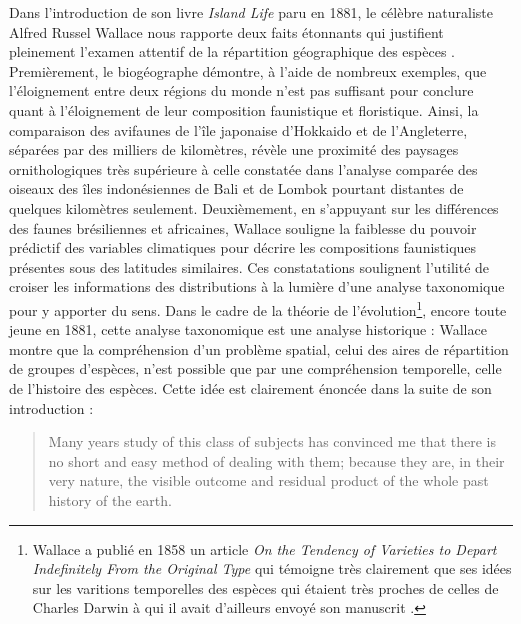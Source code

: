 Dans l'introduction de son livre \emph{Island Life} paru en 1881, le
célèbre naturaliste Alfred Russel Wallace nous rapporte deux faits
étonnants qui justifient pleinement l'examen attentif de la répartition
géographique des espèces \citep{wallace1881island}. Premièrement, le
biogéographe démontre, à l'aide de nombreux exemples, que l'éloignement
entre deux régions du monde n'est pas suffisant pour conclure quant à
l'éloignement de leur composition faunistique et floristique. Ainsi, la
comparaison des avifaunes de l'île japonaise d'Hokkaido et de
l'Angleterre, séparées par des milliers de kilomètres, révèle une
proximité des paysages ornithologiques très supérieure à celle constatée
dans l'analyse comparée des oiseaux des îles indonésiennes de Bali et de
Lombok pourtant distantes de quelques kilomètres seulement.
Deuxièmement, en s'appuyant sur les différences des faunes brésiliennes
et africaines, Wallace souligne la faiblesse du pouvoir prédictif des
variables climatiques pour décrire les compositions faunistiques
présentes sous des latitudes similaires. Ces constatations soulignent
l'utilité de croiser les informations des distributions à la lumière
d'une analyse taxonomique pour y apporter du sens. Dans le cadre de la
théorie de l'évolution\footnote{Wallace a publié en 1858 un article
  \emph{On the Tendency of Varieties to Depart Indefinitely From the
  Original Type} qui témoigne très clairement que ses idées sur les
  varitions temporelles des espèces qui étaient très proches de celles
  de Charles Darwin à qui il avait d'ailleurs envoyé son manuscrit
  \citep{Wallace1858}.}, encore toute jeune en 1881, cette analyse
taxonomique est une analyse historique : Wallace montre que la
compréhension d'un problème spatial, celui des aires de répartition de
groupes d'espèces, n'est possible que par une compréhension temporelle,
celle de l'histoire des espèces. Cette idée est clairement énoncée dans
la suite de son introduction :

\begin{quote}
Many years study of this class of subjects has convinced me that there
is no short and easy method of dealing with them; because they are, in
their very nature, the visible outcome and residual product of the whole
past history of the earth.
\end{quote}

